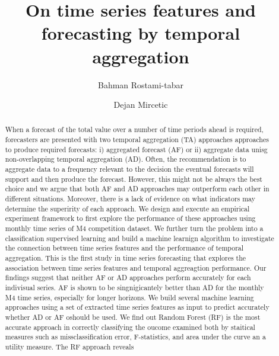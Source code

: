\documentclass[]{elsarticle} %
\begin{document}
\begin{frontmatter}

  \title{On time series features and forecasting by temporal
aggregation}
    \author[Cardiff Business School]{Bahman Rostami-tabar}
    \author[University of Novi Sad]{Dejan Mircetic}
      \address[Cardiff Business School]{Cardiff business school, 3 Colum
Drive, CF10 3EU, Cardiff}
    \address[University of Novi Sad]{Trg Dostiteja Obradovica 6, 2100
Novi Sad, Republic of Serbia}
  
  \begin{abstract}
  When a forecast of the total value over a number of time periods ahead
  is required, forecasters are presented with two temporal aggregation
  (TA) approaches approaches to produce required forecasts: i)
  aggregated forecast (AF) or ii) aggregate data unisg non-overlapping
  temporal aggregation (AD). Often, the recommendation is to aggregate
  data to a frequency relevant to the decision the eventual forecasts
  will support and then produce the forecast. However, this might not be
  always the best choice and we argue that both AF and AD approaches may
  outperform each other in different situations. Moreover, there is a
  lack of evidence on what indicators may determine the superirity of
  each approach. We design and execute an empirical experiment framework
  to first explore the performance of these approaches using monthly
  time series of M4 competition dataset. We further turn the problem
  into a classification supervised learning and build a machine learnign
  algorithm to investigate the connection between time series features
  and the performance of temporal aggregation. This is the first study
  in time series forecasting that explores the association between time
  series features and temporal aggreagtion performance. Our findings
  suggest that neither AF or AD approaches perform accurately for each
  indivisual series. AF is shown to be singnigicantely better than AD
  for the monthly M4 time series, especially for longer horizons. We
  build several machine learning approaches using a set of extracted
  time series features as input to predict accurately whether AD or AF
  oshould be used. We find out Random Forest (RF) is the most accurate
  approach in correctly classifying the oucome examined both by
  staitical measures such as missclassification error, F-statistics, and
  area under the curve an a utility measure. The RF approach reveals

\end{abstract}
\end{frontmatter}
\end{document}

